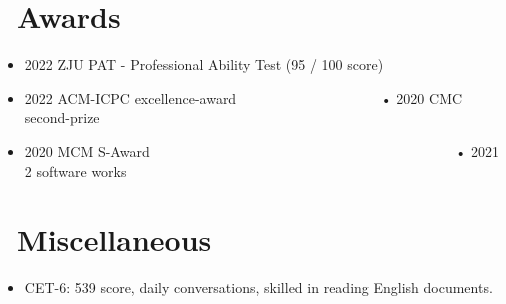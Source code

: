\documentclass{resume}
\begin{document}



\section{\faCalendarCheckO\ Awards}
\begin{itemize}[parsep=0.5ex]
  \item 2022 ZJU PAT - Professional Ability Test (95 / 100 score) 
  \item 2022 ACM-ICPC excellence-award \ \ \ \ \ \ \ \ \ \ \ \ \ \ \ \ \ \ \ \  • 2020 CMC second-prize
  \item 2020 MCM S-Award \ \ \ \ \ \ \ \ \ \ \ \ \ \ \ \ \ \ \ \ \ \ \ \ \ \ \ \ \ \ \ \ \ \ \ \ \ \ \ \ \ \ \ • 2021 2 software works
\end{itemize}

\section{\faPlusCircle\ Miscellaneous}
\begin{itemize}[parsep=0.5ex]
  \item CET-6: 539 score, daily conversations, skilled in reading English documents.
\end{itemize}

%
%
\end{document}
